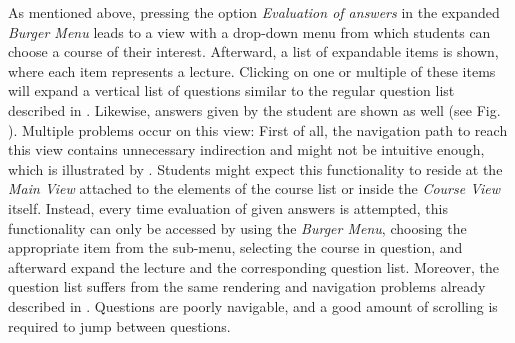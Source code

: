 As mentioned above, pressing the option \emph{Evaluation of answers} in the expanded \emph{Burger Menu} leads to a view with a drop-down menu from which students can choose a course of their interest. Afterward, a list of expandable items is shown, where each item represents a lecture. Clicking on one or multiple of these items will expand a vertical list of questions similar to the regular question list described in . Likewise, answers given by the student are shown as well (see Fig. \todogrf).
Multiple problems occur on this view: First of all, the navigation path to reach this view contains unnecessary indirection and might not be intuitive enough, which is illustrated by . Students might expect this functionality to reside at the \emph{Main View} attached to the elements of the course list or inside the \emph{Course View} itself. Instead, every time evaluation of given answers is attempted, this functionality can only be accessed by using the \emph{Burger Menu}, choosing the appropriate item from the sub-menu, selecting the course in question, and afterward expand the lecture and the corresponding question list.
Moreover, the question list suffers from the same rendering and navigation problems already described in . Questions are poorly navigable, and a good amount of scrolling is required to jump between questions.


